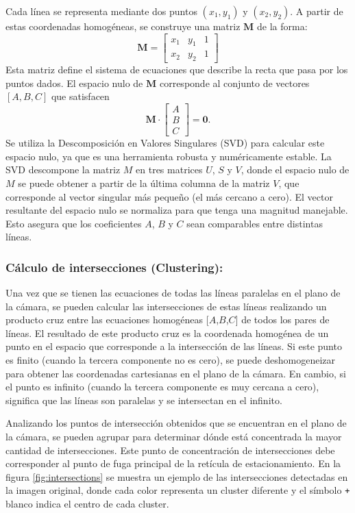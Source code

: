 \noindent
Cada línea se representa mediante dos puntos $(x_1, y_1)$ y $(x_2, y_2)$. A partir de estas coordenadas homogéneas,
se construye una matriz $\mathbf{M}$ de la forma:
\[
    \mathbf{M} = \begin{bmatrix}
        x_1 & y_1 & 1 \\
        x_2 & y_2 & 1
    \end{bmatrix}
\]
Esta matriz define el sistema de ecuaciones que describe la recta que pasa por los puntos dados.
El espacio nulo de $\mathbf{M}$ corresponde al conjunto de vectores $[A,B,C]$ que satisfacen
\[
    \mathbf{M} \cdot \begin{bmatrix}
        A \\ B \\ C
    \end{bmatrix} = \mathbf{0}.
\]
Se utiliza la Descomposición en Valores Singulares (SVD) \cite{golub2013matrix} para calcular este espacio nulo, ya que es una herramienta robusta y numéricamente estable.
La SVD descompone la matriz \(M\) en tres matrices \(U\), \(S\) y \(V\), donde el espacio nulo de \(M\) se puede obtener a partir de la última columna de la matriz \(V\), que corresponde al vector singular más pequeño (el más cercano a cero).
El vector resultante del espacio nulo se normaliza para que tenga una magnitud manejable.
Esto asegura que los coeficientes \(A\), \(B\) y \(C\) sean comparables entre distintas líneas.

\subsubsection{Cálculo de intersecciones (Clustering):}
\noindent
Una vez que se tienen las ecuaciones de todas las líneas paralelas en el plano de la cámara, se pueden calcular las intersecciones de estas líneas realizando un producto cruz entre las ecuaciones homogéneas [\(A\),\(B\),\(C\)] de todos los pares de líneas.
\noindent
El resultado de este producto cruz es la coordenada homogénea de un punto en el espacio que corresponde a la intersección de las líneas.
Si este punto es finito (cuando la tercera componente no es cero), se puede deshomogeneizar para obtener las coordenadas cartesianas en el plano de la cámara.
En cambio, si el punto es infinito (cuando la tercera componente es muy cercana a cero), significa que las líneas son paralelas y se intersectan en el infinito.

\noindent
Analizando los puntos de intersección obtenidos que se encuentran en el plano de la cámara, se pueden agrupar para determinar dónde está
concentrada la mayor cantidad de intersecciones.
Este punto de concentración de intersecciones debe corresponder al punto de fuga principal de la retícula de estacionamiento.
En la figura \ref{fig:intersections} se muestra un ejemplo de las intersecciones detectadas en la imagen original,
donde cada color representa un cluster diferente y el símbolo \texttt{+} blanco indica el centro de cada cluster.
\\

